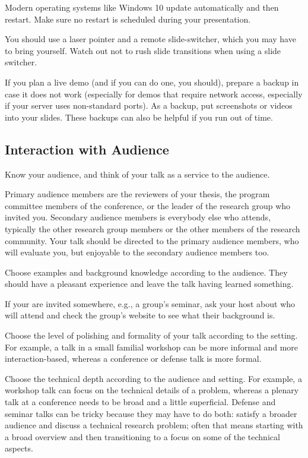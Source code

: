 \documentclass[12pt]{article}
\begin{document}
Modern operating systems like Windows 10 update automatically and then restart.
Make sure no restart is scheduled during your presentation.
\medskip

You should use a laser pointer and a remote slide-switcher, which you may have to bring yourself.
Watch out not to rush slide transitions when using a slide switcher.
\medskip

If you plan a live demo (and if you can do one, you should), prepare a backup in case it does not work (especially for demos that require network access, especially if your server uses non-standard ports).
As a backup, put screenshots or videos into your slides.
These backups can also be helpful if you run out of time.

\subsection{Interaction with Audience}

Know your audience, and think of your talk as a service to the audience.
\begin{compactitem}
\item Primary audience members are the reviewers of your thesis, the program committee members of the conference, or the leader of the research group who invited you.
Secondary audience members is everybody else who attends, typically the other research group members or the other members of the research community.
Your talk should be directed to the primary audience members, who will evaluate you, but enjoyable to the secondary audience members too.
\item Choose examples and background knowledge according to the audience. They should have a pleasant experience and leave the talk having learned something.
\item If your are invited somewhere, e.g., a group's seminar, ask your host about who will attend and check the group's website to see what their background is.
\item Choose the level of polishing and formality of your talk according to the setting.
For example, a talk in a small familial workshop can be more informal and more interaction-based, whereas a conference or defense talk is more formal.
\item Choose the technical depth according to the audience and setting. For example, a workshop talk can focus on the technical details of a problem, whereas a plenary talk at a conference needs to be broad and a little superficial.
Defense and seminar talks can be tricky because they may have to do both: satisfy a broader audience and discuss a technical research problem; often that means starting with a broad overview and then transitioning to a focus on some of the technical aspects.
\end{compactitem}
\end{document}

